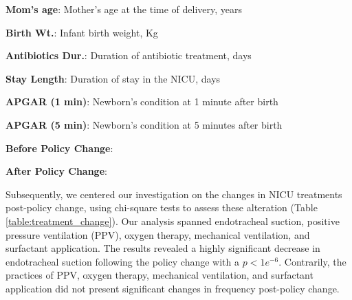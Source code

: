 \documentclass[11pt]{article}
\begin{document}
\begin{table}[h]
\caption{Descriptive statistics of key variables stratified by PrePost}
\label{table:prepost_stats}
\begin{threeparttable}
\renewcommand{\TPTminimum}{\linewidth}
\begin{tablenotes}
\footnotesize
\item \textbf{Mom's age}: Mother's age at the time of delivery, years
\item \textbf{Birth Wt.}: Infant birth weight, Kg
\item \textbf{Antibiotics Dur.}: Duration of antibiotic treatment, days
\item \textbf{Stay Length}: Duration of stay in the NICU, days
\item \textbf{APGAR (1 min)}: Newborn's condition at 1 minute after birth
\item \textbf{APGAR (5 min)}: Newborn's condition at 5 minutes after birth
\item \textbf{Before Policy Change}: 
\item \textbf{After Policy Change}: 
\end{tablenotes}
\end{threeparttable}
\end{table}


Subsequently, we centered our investigation on the changes in NICU treatments post-policy change, using chi-square tests to assess these alteration (Table \ref{table:treatment_change}). Our analysis spanned endotracheal suction, positive pressure ventilation (PPV), oxygen therapy, mechanical ventilation, and surfactant application. The results revealed a highly significant decrease in endotracheal suction following the policy change with a $p<1e^{-6}$. Contrarily, the practices of PPV, oxygen therapy, mechanical ventilation, and surfactant application did not present significant changes in frequency post-policy change.
\end{document}
